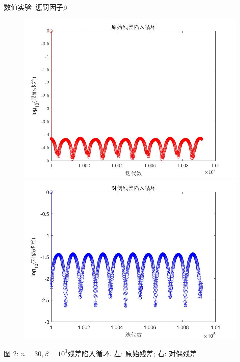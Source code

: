 \documentclass{beamer}
\begin{document}
\begin{frame}{数值实验--惩罚因子$\beta$}
{\begin{figure}[htbp]
	\centering
	\includegraphics[width=.37\paperwidth]{primalres.jpg}
	\includegraphics[width=.37\paperwidth]{dualres.jpg}
	\label{loop}
\end{figure}
\begin{center}
	\small\textcolor[rgb]{0,0.25,0.604}{图 2: }$n=30,\beta=10^3$残差陷入循环. 左: 原始残差; 右: 对偶残差
\end{center}
}
\end{frame}

\end{document}

